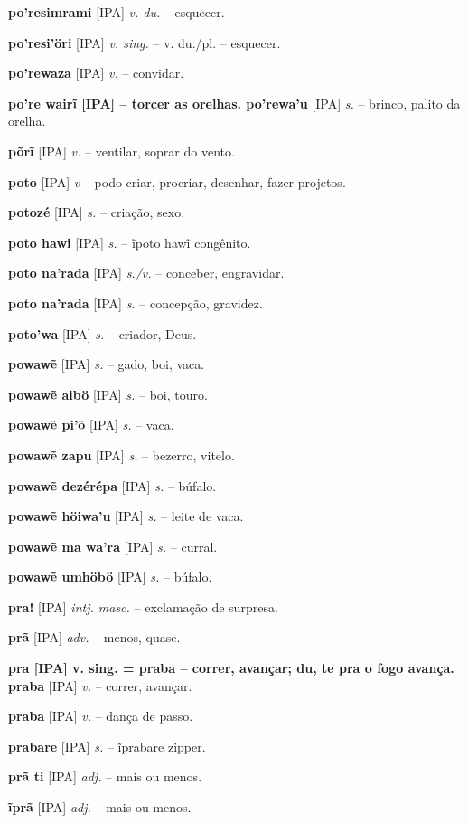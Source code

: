 \textbf{po'resimrami} [IPA] \textit{v. du.} -- esquecer.

\textbf{po'resi'öri} [IPA] \textit{v. sing.} -- v. du./pl. -- esquecer.

\textbf{po'rewaza} [IPA] \textit{v.} -- convidar.

\textbf{po're wairĩ [IPA]  -- torcer as orelhas. po'rewa'u} [IPA] \textit{s.} -- brinco, palito da orelha.

\textbf{põrĩ} [IPA] \textit{v.} -- ventilar, soprar do vento.

\textbf{poto} [IPA] \textit{v} -- podo criar, procriar, desenhar, fazer projetos.

\textbf{potozé} [IPA] \textit{s.} -- criação, sexo.

\textbf{poto hawi} [IPA] \textit{s.} -- ĩpoto hawĩ congênito.

\textbf{poto na'rada} [IPA] \textit{s./v.} -- conceber, engravidar.

\textbf{poto na'rada} [IPA] \textit{s.} -- concepção, gravidez.

\textbf{poto'wa} [IPA] \textit{s.} -- criador, Deus.

\textbf{powawẽ} [IPA] \textit{s.} -- gado, boi, vaca.

\textbf{powawẽ aibö} [IPA] \textit{s.} -- boi, touro.

\textbf{powawẽ pi'õ} [IPA] \textit{s.} -- vaca.

\textbf{powawẽ zapu} [IPA] \textit{s.} -- bezerro, vitelo.

\textbf{powawẽ dezérépa} [IPA] \textit{s.} -- búfalo.

\textbf{powawẽ höiwa'u} [IPA] \textit{s.} -- leite de vaca.

\textbf{powawẽ ma wa'ra} [IPA] \textit{s.} -- curral.

\textbf{powawẽ umhöbö} [IPA] \textit{s.} -- búfalo.

\textbf{pra!} [IPA] \textit{intj. masc.} -- exclamação de surpresa.

\textbf{prã} [IPA] \textit{adv.} -- menos, quase.

\textbf{pra [IPA] v. sing. = praba -- correr, avançar; du, te pra o fogo avança. praba} [IPA] \textit{v.} -- correr, avançar.

\textbf{praba} [IPA] \textit{v.} -- dança de passo.

\textbf{prabare} [IPA] \textit{s.} -- ĩprabare zipper.

\textbf{prã ti} [IPA] \textit{adj.} -- mais ou menos.

\textbf{ĩprã} [IPA] \textit{adj.} -- mais ou menos.

